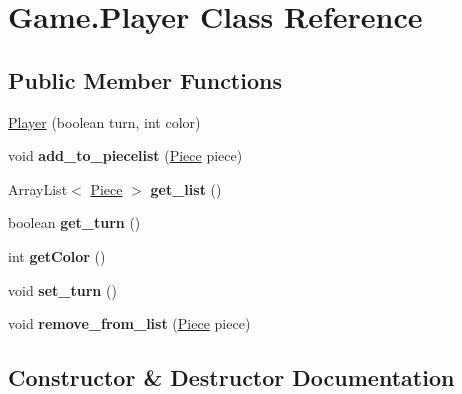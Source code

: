 \hypertarget{class_game_1_1_player}{}\section{Game.\+Player Class Reference}
\label{class_game_1_1_player}
\subsection*{Public Member Functions}
\begin{DoxyCompactItemize}
\item 
\hyperlink{class_game_1_1_player_a1181d67a7f9308d8cfa6853106dabfd5}{Player} (boolean turn, int color)
\item 
\mbox{\label{class_game_1_1_player_acbaad1a9bc0f704c56c24b602d96a5ed}} 
void {\bfseries add\+\_\+to\+\_\+piecelist} (\hyperlink{class_game_1_1_piece}{Piece} piece)
\item 
\mbox{\label{class_game_1_1_player_a80153b0267912885c3716473055898cc}} 
Array\+List$<$ \hyperlink{class_game_1_1_piece}{Piece} $>$ {\bfseries get\+\_\+list} ()
\item 
\mbox{\label{class_game_1_1_player_a5e4d4d7bf2dcb7cd205052257f8ffbca}} 
boolean {\bfseries get\+\_\+turn} ()
\item 
\mbox{\label{class_game_1_1_player_a4d29ca80f64d244c8480878ea3aab2ef}} 
int {\bfseries get\+Color} ()
\item 
\mbox{\label{class_game_1_1_player_ac751e48aa667f14c94854425eeac370c}} 
void {\bfseries set\+\_\+turn} ()
\item 
\mbox{\label{class_game_1_1_player_a9ff84160f4a596f290164c311f0273fb}} 
void {\bfseries remove\+\_\+from\+\_\+list} (\hyperlink{class_game_1_1_piece}{Piece} piece)
\end{DoxyCompactItemize}


\subsection{Constructor \& Destructor Documentation}
\mbox{\label{class_game_1_1_player_a1181d67a7f9308d8cfa6853106dabfd5}} 
